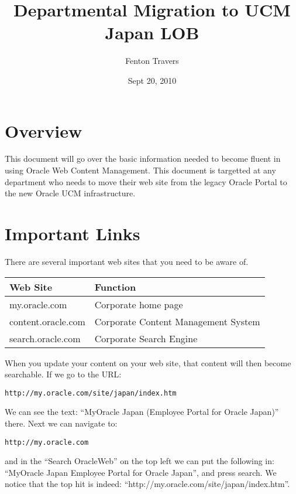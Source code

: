 \documentclass[final,letterpaper,twoside,12pt]{report}
\title{
  Departmental Migration to UCM\\
  Japan LOB}
\date{Sept 20, 2010}
\author{Fenton Travers}
\begin{document}
\maketitle
\setlength\fboxsep{1pt}
\setlength\fboxrule{0.5pt}
\newpage
\tableofcontents
\newpage
\listoffigures
\newpage
\clearpage

\section{Overview}

This document will go over the basic information needed to become fluent in using Oracle Web Content Management.  This document is targetted at any department who needs to move their web site from the legacy Oracle Portal to the new Oracle UCM infrastructure.

\section{Important Links}

There are several important web sites that you need to be aware of.

\begin{tabular}{|l l|} 
\hline
Web Site           & Function \\
\hline 
my.oracle.com      & Corporate home page \\ 
content.oracle.com & Corporate Content Management System \\ 
search.oracle.com  & Corporate Search Engine \\
\hline
\end{tabular}


When you update your content on your web site, that content will then become searchable.  If we go to the URL:

\begin{verbatim}
http://my.oracle.com/site/japan/index.htm
\end{verbatim}

We can see the text: ``MyOracle Japan (Employee Portal for Oracle Japan)'' there.  Next we can navigate to:

\begin{verbatim}
http://my.oracle.com
\end{verbatim}

and in the ``Search OracleWeb'' on the top left we can put the following in:  ``MyOracle Japan Employee Portal for Oracle Japan'', and press search.  We notice that the top hit is indeed: ``http://my.oracle.com/site/japan/index.htm''.
\end{document}

